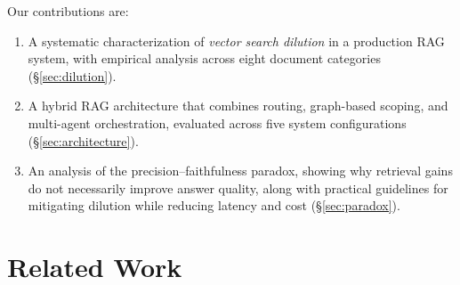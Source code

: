 \documentclass{article}
\begin{document}
Our contributions are:
\begin{enumerate}[leftmargin=*,topsep=2pt,itemsep=1pt]
    \item A systematic characterization of \emph{vector search dilution} in a production RAG system, with empirical analysis across eight document categories (\S\ref{sec:dilution}).
    \item A hybrid RAG architecture that combines routing, graph-based scoping, and multi-agent orchestration, evaluated across five system configurations (\S\ref{sec:architecture}).
    \item An analysis of the precision--faithfulness paradox, showing why retrieval gains do not necessarily improve answer quality, along with practical guidelines for mitigating dilution while reducing latency and cost (\S\ref{sec:paradox}).
\end{enumerate}


\section{Related Work}
\label{sec:related_work}
\end{document}
